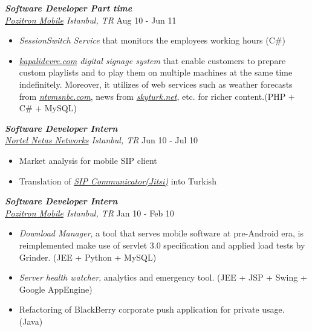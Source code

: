 \documentclass[line, margin]{res}
\begin{document}
\begin{resume}
	{\sl \textbf{Software Developer Part time} \\ \href{http://www.pozitron.com/}{Pozitron Mobile} Istanbul, TR} \hfill Aug 10 - Jun 11 \\
	\vspace{-0.3cm}
	\begin{itemize} \itemsep -2pt
		\item \textit{SessionSwitch Service} that monitors the employees working hours (C\#) 
		\item \textit{\href{http://kapalidevre.com}{kapalidevre.com} digital signage system} that enable customers to prepare custom playlists and to play them on multiple machines at the same time indefinitely. Moreover, it utilizes of web services such as weather forecasts from \textit{\href{http://www.ntvmsnbc.com/}{ntvmsnbc.com}}, news from \textit{\href{http://skyturk.net/}{skyturk.net}}, etc. for richer content.(PHP + C\# + MySQL)
	\end{itemize}

	{\sl \textbf{Software Developer Intern} \\ \href{http://en.netas.com.tr/default.aspx}{Nortel Netas Networks} Istanbul, TR} \hfill Jun 10 - Jul 10 \\
	\vspace{-0.3cm}
	\begin{itemize} \itemsep -2pt
		\item Market analysis for mobile SIP client
		\item Translation of \textit{\href{https://jitsi.org/}{SIP Communicator(Jitsi)}} into Turkish 
	\end{itemize}

	{\sl \textbf{Software Developer Intern} \\ \href{http://www.pozitron.com/}{Pozitron Mobile} Istanbul, TR} \hfill Jan 10 - Feb 10 \\
	\vspace{-0.3cm}
	\begin{itemize} \itemsep -2pt
		\item \textit{Download Manager}, a tool that serves mobile software at pre-Android era, is reimplemented make use of servlet 3.0 specification and applied load tests by Grinder. (JEE + Python + MySQL)
		\item \textit{Server health watcher}, analytics and emergency tool. (JEE + JSP + Swing + Google AppEngine)
		\item Refactoring of BlackBerry corporate push application for private usage. (Java)
	\end{itemize}							


\end{resume}
\end{document}
